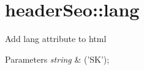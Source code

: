 \hypertarget{header_seo_1_1lang-example}{\section{header\-Seo\-::lang}
}
Add lang attribute to html 
\begin{DoxyParams}{Parameters}
{\em string} & ('S\-K');\\
\hline
\end{DoxyParams}

\begin{DoxyCodeInclude}
\end{DoxyCodeInclude}
 
